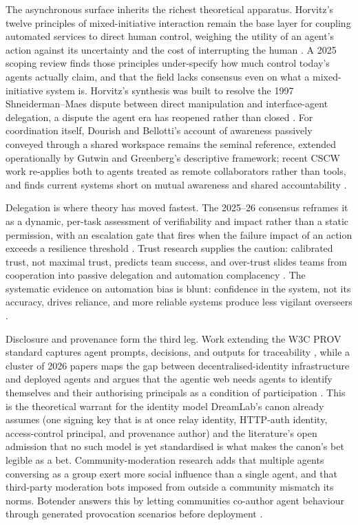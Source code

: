 The asynchronous surface inherits the richest theoretical apparatus. Horvitz's twelve principles of mixed-initiative interaction remain the base layer for coupling automated services to direct human control, weighing the utility of an agent's action against its uncertainty and the cost of interrupting the human \parencite{Horvitz1999Principles}. A 2025 scoping review finds those principles under-specify how much control today's agents actually claim, and that the field lacks consensus even on what a mixed-initiative system is. Horvitz's synthesis was built to resolve the 1997 Shneiderman--Maes dispute between direct manipulation and interface-agent delegation, a dispute the agent era has reopened rather than closed \parencite{Monadjemi2025Scoping, ShneidermanMaes1997}. For coordination itself, Dourish and Bellotti's account of awareness passively conveyed through a shared workspace remains the seminal reference, extended operationally by Gutwin and Greenberg's descriptive framework; recent CSCW work re-applies both to agents treated as remote collaborators rather than tools, and finds current systems short on mutual awareness and shared accountability \parencite{DourishBellotti1992, GutwinGreenberg2002, HCIScoping2025}.

Delegation is where theory has moved fastest. The 2025--26 consensus reframes it as a dynamic, per-task assessment of verifiability and impact rather than a static permission, with an escalation gate that fires when the failure impact of an action exceeds a resilience threshold \parencite{Tomasev2026Delegation}. Trust research supplies the caution: calibrated trust, not maximal trust, predicts team success, and over-trust slides teams from cooperation into passive delegation and automation complacency \parencite{TrustingTeammates2025, CHAIT2025}. The systematic evidence on automation bias is blunt: confidence in the system, not its accuracy, drives reliance, and more reliable systems produce less vigilant overseers \parencite{AutomationBias2012}.

Disclosure and provenance form the third leg. Work extending the W3C PROV standard captures agent prompts, decisions, and outputs for traceability \parencite{Souza2025ProvAgent}, while a cluster of 2026 papers maps the gap between decentralised-identity infrastructure and deployed agents and argues that the agentic web needs agents to identify themselves and their authorising principals as a condition of participation \parencite{AIIdentity2026, AuthenticatedDelegation2025, AgenticWebNorms2026}. This is the theoretical warrant for the identity model DreamLab's canon already assumes (one signing key that is at once relay identity, HTTP-auth identity, access-control principal, and provenance author) and the literature's open admission that no such model is yet standardised is what makes the canon's bet legible as a bet. Community-moderation research adds that multiple agents conversing as a group exert more social influence than a single agent, and that third-party moderation bots imposed from outside a community mismatch its norms. Botender answers this by letting communities co-author agent behaviour through generated provocation scenarios before deployment \parencite{Song2025SocialGroups, ThirdPartyBots2024, Kuo2026Botender}.

